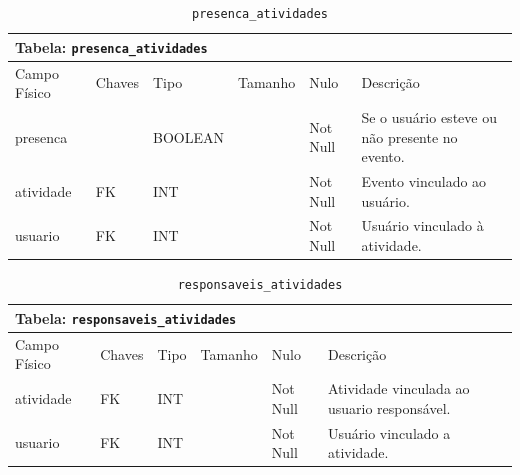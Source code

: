 \documentclass[12pt,a4paper]{article}
\begin{document}
\begin{center}
\begin{table}[h!]
	\caption{\texttt{presenca\_atividades}}
	\label{tabela:presencaAtividades}
	\begin{tabular}{|p{2.5cm}|p{1cm}|p{1.25cm}|p{1.75cm}|p{1.25cm}|p{6cm}|}\hline	
		\multicolumn{6}{|p{16cm}|}{\cellcolor{cinzaClaro}  \centering Tabela: \texttt{presenca\_atividades}} \\ \hline %
		{\small Campo Físico}   & {\small Chaves} & {\small Tipo} & {\small Tamanho} & {\small Nulo} & {\small Descrição}\\\hline %
		
		{\tiny presenca} & {\tiny } & {\tiny BOOLEAN} & {\tiny } & {\tiny Not Null} &{\tiny Se o usuário esteve ou não presente no evento.}\\\hline
		{\tiny atividade}  & {\tiny FK} & {\tiny INT} & {\tiny } & {\tiny Not Null} &{\tiny Evento vinculado ao usuário.}\\\hline
		{\tiny usuario}  & {\tiny FK} & {\tiny INT} & {\tiny } & {\tiny Not Null} &{\tiny Usuário vinculado à atividade.}\\\hline
			
	\end{tabular}
\end{table}	
\end{center}


\begin{center}
\begin{table}[h!]
	\caption{\texttt{responsaveis\_atividades}}
	\label{tabela:responsaveisAtividades}
	\begin{tabular}{|p{2.5cm}|p{1cm}|p{1.25cm}|p{1.75cm}|p{1.25cm}|p{6cm}|}\hline	
		\multicolumn{6}{|p{16cm}|}{\cellcolor{cinzaClaro}  \centering Tabela: \texttt{responsaveis\_atividades}} \\ \hline %
		{\small Campo Físico}   & {\small Chaves} & {\small Tipo} & {\small Tamanho} & {\small Nulo} & {\small Descrição}\\\hline %
		
		{\tiny atividade}  & {\tiny FK} & {\tiny INT} & {\tiny } & {\tiny Not Null} &{\tiny Atividade vinculada ao usuario responsável.}\\\hline
		{\tiny usuario} & {\tiny FK} & {\tiny INT} & {\tiny } & {\tiny Not Null} &{\tiny Usuário vinculado a atividade.}\\\hline
			
	\end{tabular}
\end{table}	
\end{center}
\end{document}
